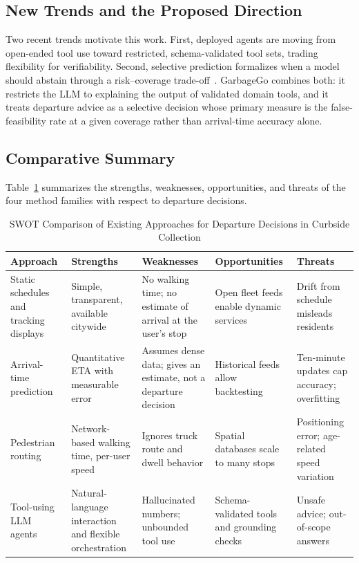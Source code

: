 \subsection{New Trends and the Proposed Direction}
Two recent trends motivate this work. First, deployed agents are moving from open-ended tool use toward restricted, schema-validated tool sets, trading flexibility for verifiability. Second, selective prediction formalizes when a model should abstain through a risk--coverage trade-off~\cite{chow1970,geifman2017}. GarbageGo combines both: it restricts the LLM to explaining the output of validated domain tools, and it treats departure advice as a selective decision whose primary measure is the false-feasibility rate at a given coverage rather than arrival-time accuracy alone.

\subsection{Comparative Summary}
Table~\ref{tab:swot} summarizes the strengths, weaknesses, opportunities, and threats of the four method families with respect to departure decisions.

\begin{table}[t]
\caption{SWOT Comparison of Existing Approaches for Departure Decisions in Curbside Collection}
\label{tab:swot}
\centering
\footnotesize
\begin{tabular}{@{}*{5}{>{\raggedright\arraybackslash}p{}}@{}}
\toprule
Approach & Strengths & Weaknesses & Opportunities & Threats \\
\midrule
Static schedules and tracking displays~\cite{belien2014,taichung_fleet_api} & Simple, transparent, available citywide & No walking time; no estimate of arrival at the user's stop & Open fleet feeds enable dynamic services & Drift from schedule misleads residents \\
\addlinespace
Arrival-time prediction~\cite{chien2002,jeong2004} & Quantitative ETA with measurable error & Assumes dense data; gives an estimate, not a departure decision & Historical feeds allow backtesting & Ten-minute updates cap accuracy; overfitting \\
\addlinespace
Pedestrian routing~\cite{knoblauch1996,postgis} & Network-based walking time, per-user speed & Ignores truck route and dwell behavior & Spatial databases scale to many stops & Positioning error; age-related speed variation \\
\addlinespace
Tool-using LLM agents~\cite{yao2023react,schick2023toolformer,patil2023gorilla} & Natural-language interaction and flexible orchestration & Hallucinated numbers; unbounded tool use~\cite{ji2023hallucination} & Schema-validated tools and grounding checks & Unsafe advice; out-of-scope answers \\
\bottomrule
\end{tabular}
\end{table}
